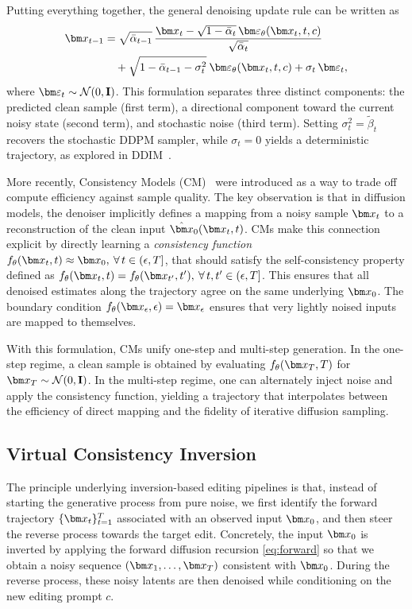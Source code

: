 Putting everything together, the general denoising update rule can be written as~\cite{ddim}
\begin{align}
    \x_{t-1} &= \sqrt{\bar\alpha_{t-1}}\,\frac{\x_t - \sqrt{1-\bar\alpha_t}\,\eps_\theta(\x_t,t,c)}{\sqrt{\bar\alpha_t}} \nonumber \\
    &\quad + \sqrt{1-\bar\alpha_{t-1}-\sigma_t^2}\:\eps_\theta(\x_t,t,c) + \sigma_t\,\eps_t,
    \label{eq:denoising}
\end{align}
where $\eps_t\sim\mathcal{N}(0,\mathbf I)$. This formulation separates three distinct components: the predicted clean sample (first term), a directional component toward the current noisy state (second term), and stochastic noise (third term). Setting $\sigma_t^2=\tilde\beta_t$ recovers the stochastic DDPM sampler, while $\sigma_t=0$ yields a deterministic trajectory, as explored in DDIM~\cite{ddim}.

More recently, Consistency Models (CM)~\cite{consistencymodels} were introduced as a way to trade off compute efficiency against sample quality. The key observation is that in diffusion models, the denoiser implicitly defines a mapping from a noisy sample $\x_t$ to a reconstruction of the clean input $\hat \x_0(\x_t,t)$. CMs make this connection explicit by directly learning a \emph{consistency function} ${f_\theta(\x_t,t)\approx \x_0, \: \forall \, t\in(\epsilon,T]}$, that should satisfy the self-consistency property defined as ${f_\theta(\x_t,t) = f_\theta(\x_{t'},t'), \: \forall\, t,t'\in(\epsilon,T]}$. This ensures that all denoised estimates along the trajectory agree on the same underlying $\x_0$. The boundary condition $f_\theta(\x_\epsilon,\epsilon)=\x_\epsilon$ ensures that very lightly noised inputs are mapped to themselves.  

With this formulation, CMs unify one-step and multi-step generation. In the one-step regime, a clean sample is obtained by evaluating $f_\theta(\x_T,T)$ for $\x_T\sim\mathcal{N}(0,\mathbf I)$. In the multi-step regime, one can alternately inject noise and apply the consistency function, yielding a trajectory that interpolates between the efficiency of direct mapping and the fidelity of iterative diffusion sampling.

\subsection{Virtual Consistency Inversion}\label{ssec:vci_edit}

The principle underlying inversion-based editing pipelines is that, instead of starting the generative process from pure noise, we first identify the forward trajectory $\{\x_t\}_{t=1}^T$ associated with an observed input $\x_0$, and then steer the reverse process towards the target edit. Concretely, the input $\x_0$ is inverted by applying the forward diffusion recursion \cref{eq:forward} so that we obtain a noisy sequence $(\x_1,\dots,\x_T)$ consistent with $\x_0$. During the reverse process, these noisy latents are then denoised while conditioning on the new editing prompt $c$.

